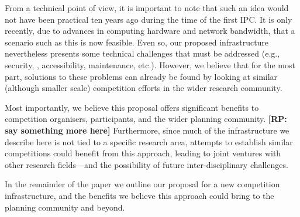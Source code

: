 From a technical point of view, it is important to note that such an idea
would not have been practical ten years ago during the time of the first
IPC. It is only recently, due to advances in computing hardware and network
bandwidth, that a scenario such as this is now feasible. Even so, our
proposed infrastructure nevertheless presents some technical challenges
that must be addressed (e.g., security, , accessibility, maintenance,
etc.). However, we believe that for the most part, solutions to these
problems can already be found by looking at similar (although smaller
scale) competition efforts in the wider research community.

Most importantly, we believe this proposal offers significant benefits to
competition organisers, participants, and the wider planning community.
\textbf{[RP: say something more here]} Furthermore, since much of the
infrastructure we describe here is not tied to a specific research area,
attempts to establish similar competitions could benefit from this
approach, leading to joint ventures with other research fields---and the
possibility of future inter-disciplinary challenges.

In the remainder of the paper we outline our proposal for a new competition
infrastructure, and the benefits we believe this approach could bring to
the planning community and beyond.

